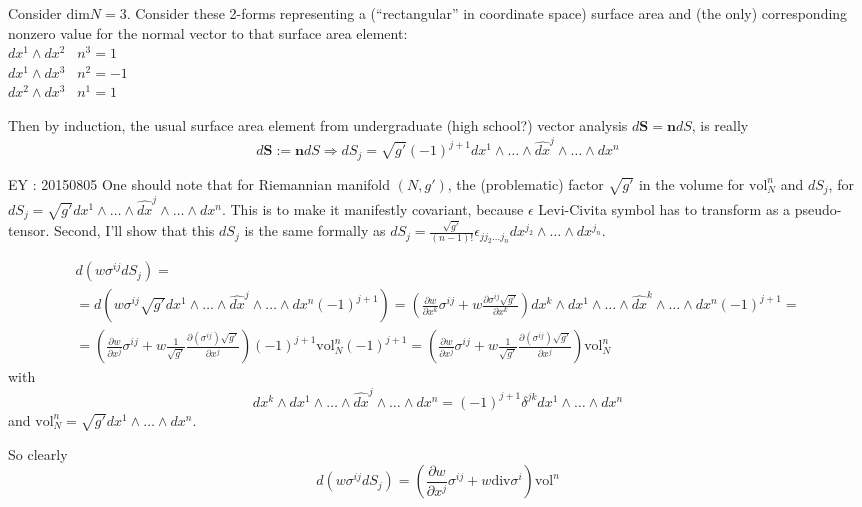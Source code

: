 \documentclass[twoside,landscape,10pt]{amsart}
\theoremstyle{plain}
\theoremstyle{definition}
\theoremstyle{remark}
\begin{document}
\begin{multicols*}{2}
Consider $\text{dim}N =3$.  Consider these 2-forms representing a (``rectangular'' in coordinate space) surface area and (the only) corresponding nonzero value for the normal vector to that surface area element: \\
$dx^1 \wedge dx^2$ \quad \quad \, $n^3=1$ \\
$dx^1 \wedge dx^3$ \quad \quad \, $n^2=-1$ \\
$dx^2 \wedge dx^3$ \quad \quad \, $n^1=1$ 

Then by induction, the usual surface area element from undergraduate (high school?) vector analysis $d\mathbf{S} = \mathbf{n} dS$, is really
\[
d\mathbf{S} := \mathbf{n} dS \Longrightarrow dS_j = \sqrt{g'} (-1)^{j+1} dx^1 \wedge \dots \wedge \widehat{dx}^j \wedge \dots \wedge dx^n
\]

EY : 20150805 One should note that for Riemannian manifold $(N,g')$, the (problematic) factor $\sqrt{g'}$ in the volume for $\text{vol}^n_N$ and $dS_j$, for $dS_j = \sqrt{g'} dx^1 \wedge \dots \wedge \widehat{dx}^j \wedge \dots \wedge dx^n$.  This is to make it manifestly covariant, because $\epsilon$ Levi-Civita symbol has to transform as a pseudo-tensor.  Second, I'll show that this $dS_j$ is the same formally as $dS_j = \frac{\sqrt{g'}}{(n-1)!} \epsilon_{jj_2\dots j_n} dx^{j_2} \wedge \dots \wedge dx^{j_n}$.  

\[
\begin{gathered}
  d(w \sigma^{ij} dS_j) = \\
   = d(w \sigma^{ij} \sqrt{g'} dx^1 \wedge \dots \wedge \widehat{dx}^j \wedge \dots \wedge dx^n (-1)^{j+1}) = \left( \frac{ \partial w}{ \partial x^k} \sigma^{ij} + w \frac{ \partial \sigma^{ij} \sqrt{g'}}{ \partial x^k} \right) dx^k \wedge dx^1 \wedge \dots \wedge \widehat{dx}^k \wedge \dots \wedge dx^n (-1)^{j+1} = \\
  = \left( \frac{ \partial w}{ \partial x^j} \sigma^{ij} + w \frac{1}{\sqrt{g'}} \frac{ \partial (\sigma^{ij}) \sqrt{g'} }{ \partial x^j} \right) (-1)^{j+1} \text{vol}^n_N (-1)^{j+1} =  \left( \frac{ \partial w}{ \partial x^j} \sigma^{ij} + w \frac{1}{\sqrt{g'}} \frac{ \partial (\sigma^{ij}) \sqrt{g'} }{ \partial x^j} \right)  \text{vol}^n_N
\end{gathered}
\]
with
\[
dx^k \wedge dx^1 \wedge \dots \wedge \widehat{dx}^j \wedge \dots \wedge dx^n = (-1)^{j+1} \delta^{jk} dx^1 \wedge \dots \wedge dx^n
\]
and $\text{vol}_N^n = \sqrt{g'} dx^1 \wedge \dots \wedge dx^n$.  

So clearly 
\[
d(w\sigma^{ij} dS_j) = \left( \frac{ \partial w}{ \partial x^j} \sigma^{ij} + w \text{div}\sigma^i \right) \text{vol}^n
\]


\end{multicols*}
\end{document}
